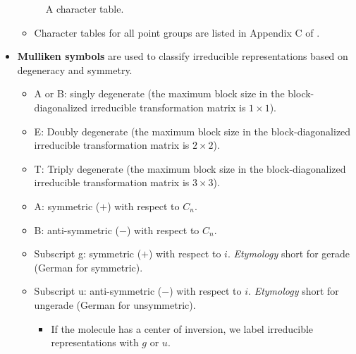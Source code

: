 \documentclass[../notes.tex]{subfiles}
\begin{document}
\begin{itemize}
\begin{figure}[h!]
        \caption{A character table.}
        \label{fig:characterTable}
    \end{figure}
    \begin{itemize}
        \item Character tables for all point groups are listed in Appendix C of \textcite{bib:MiesslerFischerTarr}.
    \end{itemize}
    \item \textbf{Mulliken symbols} are used to classify irreducible representations based on degeneracy and symmetry.
    \begin{itemize}
        \item A or B: singly degenerate (the maximum block size in the block-diagonalized irreducible transformation matrix is $1\times 1$).
        \item E: Doubly degenerate (the maximum block size in the block-diagonalized irreducible transformation matrix is $2\times 2$).
        \item T: Triply degenerate (the maximum block size in the block-diagonalized irreducible transformation matrix is $3\times 3$).
        \item A: symmetric ($+$) with respect to $C_n$.
        \item B: anti-symmetric ($-$) with respect to $C_n$.
        \item Subscript g: symmetric ($+$) with respect to $i$. \emph{Etymology} short for gerade (German for symmetric).
        \item Subscript u: anti-symmetric ($-$) with respect to $i$. \emph{Etymology} short for ungerade (German for unsymmetric).
        \begin{itemize}
            \item If the molecule has a center of inversion, we label irreducible representations with $g$ or $u$.
        \end{itemize}

\end{itemize}
\end{itemize}
\end{document}
